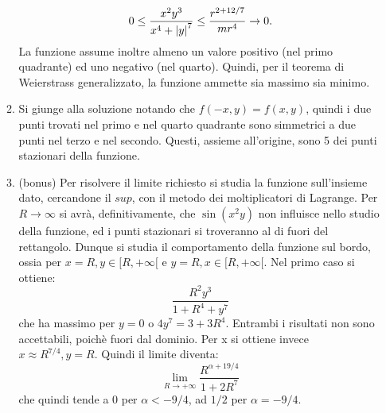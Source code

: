 \documentclass[a4paper]{article}
\begin{document}
\begin{itemize}
\begin{enumerate}[label=(\alph*)]
\begin{equation}
0 \leq \frac{x^{2}y^{3}}{x^{4}+ \abs{y}^{7}} \leq \frac{r^{2+12/7}}{mr^{4}} \rightarrow 0.
\end{equation}
La funzione assume inoltre almeno un valore positivo (nel primo quadrante) ed uno negativo (nel quarto). Quindi, per il teorema di Weierstrass generalizzato, la funzione ammette sia massimo sia minimo.
\item Si giunge alla soluzione notando che $f(-x,y)=f(x,y)$, quindi i due punti trovati nel primo e nel quarto quadrante sono simmetrici a due punti nel terzo e nel secondo. Questi, assieme all'origine, sono 5 dei punti stazionari della funzione.
\item (bonus) Per risolvere il limite richiesto si studia la funzione sull'insieme dato, cercandone il $sup$, con il metodo dei moltiplicatori di Lagrange. Per $R \rightarrow \infty$ si avrà, definitivamente, che $\sin(x^2y)$ non influisce nello studio della funzione, ed i punti stazionari si troveranno al di fuori del rettangolo. Dunque si studia il comportamento della funzione sul bordo, ossia per $x=R, y \in [R,+\infty[$ e $y=R, x \in [R,+\infty[$.
Nel primo caso si ottiene:
\begin{equation}
\frac{R^{2}y^{3}}{1+R^{4}+y^{7}}
\end{equation}
che ha massimo per $y=0$ o $4y^{7}=3+3R^{4}$. Entrambi i risultati non sono accettabili, poichè fuori dal dominio. Per x si ottiene invece $x\approx R^{7/4}, y=R$. Quindi il limite diventa:
\begin{equation}
\lim_{R\to +\infty} \frac{R^{\alpha + 19/4}}{1+2R^{7}}
\end{equation}
che quindi tende a 0 per $\alpha < -9/4$, ad $1/2$ per $\alpha = -9/4$.  
\end{enumerate}







\end{itemize}
\end{document}
